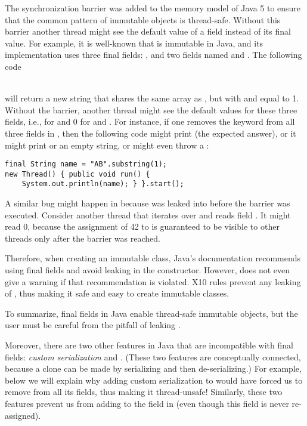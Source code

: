 The synchronization barrier was added to the memory model of Java 5
    to ensure that the common pattern of immutable objects is thread-safe.
Without this barrier another thread might see the default value of a field
    instead of its final value.
For example, it is well-known that  is immutable in Java,
    and its implementation uses three {final} fields:
    , and two  fields named  and .
The following code

~~~~~~~~~~\\
will return a new string 
    that shares
    the same  array as , %
    but with  and  equal to 1.
Without the barrier, %
    another thread might see the default values for these three fields,
    i.e.,  for  and 0 for  and .
For instance,
    if one removes the  keyword from all three fields in ,
    then
    the following code might print  (the expected answer),
    or it might print
     or an empty string,
    or might even throw a :
\begin{lstlisting}
final String name = "AB".substring(1);
new Thread() { public void run() {
    System.out.println(name); } }.start();
\end{lstlisting}

A similar bug might happen in 
    because \this was leaked into  before the barrier was executed.
Consider another thread that iterates over  and reads field .
It might read 0, because the assignment of 42 to  is guaranteed to be visible to other threads
    only after the barrier was reached.

Therefore, when creating an immutable class,
    Java's documentation recommends using final fields
    and avoid leaking \this in the constructor.
However,  does not even give a warning if that recommendation is violated.
X10 rules prevent any leaking of \this,
    thus making it safe and easy to create immutable classes.

To summarize, final fields in Java
    enable thread-safe immutable objects,
    but the user must be careful from the pitfall of leaking \this.

Moreover, there are two other features in Java that are incompatible with {final} fields:
    \emph{custom serialization} and .
(These two features are conceptually connected,
    because a clone can be made by serializing and then de-serializing.)
For example, below we will explain why adding custom serialization to 
    would have forced us to remove  from all its fields,
    thus making it thread-unsafe!
Similarly, these two features prevent us from adding  to the 
    field in 
    (even though this field is never re-assigned).


